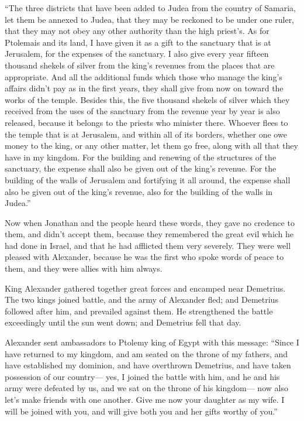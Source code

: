  ``The three districts that have been added to Judea from
the country of Samaria, let them be annexed to Judea, that they may be
reckoned to be under one ruler, that they may not obey any other
authority than the high priest's.  As for Ptolemais and its
land, I have given it as a gift to the sanctuary that is at Jerusalem,
for the expenses of the sanctuary.  I also give every year
fifteen thousand shekels of silver from the king's revenues from the
places that are appropriate.  And all the additional funds
which those who manage the king's affairs didn't pay as in the first
years, they shall give from now on toward the works of the temple.
 Besides this, the five thousand shekels of silver which
they received from the uses of the sanctuary from the revenue year by
year is also released, because it belongs to the priests who minister
there.  Whoever flees to the temple that is at Jerusalem,
and within all of its borders, whether one owe money to the king, or any
other matter, let them go free, along with all that they have in my
kingdom.  For the building and renewing of the structures
of the sanctuary, the expense shall also be given out of the king's
revenue.  For the building of the walls of Jerusalem and
fortifying it all around, the expense shall also be given out of the
king's revenue, also for the building of the walls in Judea.''

 Now when Jonathan and the people heard these words, they
gave no credence to them, and didn't accept them, because they
remembered the great evil which he had done in Israel, and that he had
afflicted them very severely.  They were well pleased with
Alexander, because he was the first who spoke words of peace to them,
and they were allies with him always.

 King Alexander gathered together great forces and encamped
near Demetrius.  The two kings joined battle, and the army
of Alexander fled; and Demetrius followed after him, and prevailed
against them.  He strengthened the battle exceedingly until
the sun went down; and Demetrius fell that day.

 Alexander sent ambassadors to Ptolemy king of Egypt with
this message:  ``Since I have returned to my kingdom, and
am seated on the throne of my fathers, and have established my dominion,
and have overthrown Demetrius, and have taken possession of our
country---  yes, I joined the battle with him, and he and
his army were defeated by us, and we sat on the throne of his kingdom---
 now also let's make friends with one another. Give me now
your daughter as my wife. I will be joined with you, and will give both
you and her gifts worthy of you.''

